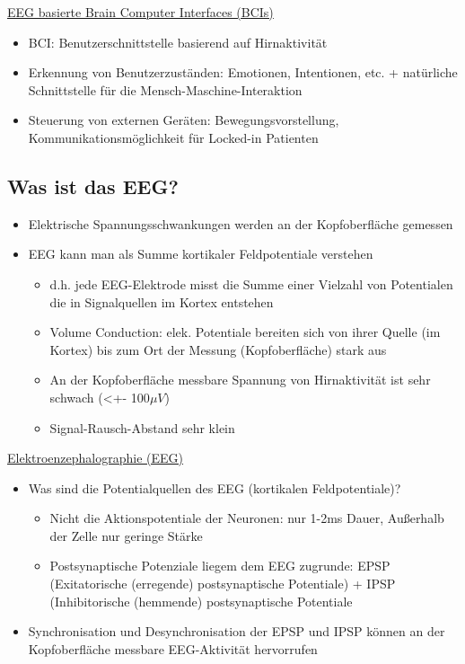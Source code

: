 \documentclass[a4paper,10pt,oneside]{article}
\begin{document}
\underline{EEG basierte Brain Computer Interfaces (BCIs)} \\	
	\begin{itemize}
		\item BCI: Benutzerschnittstelle basierend auf Hirnaktivität
		\item Erkennung von Benutzerzuständen: Emotionen, Intentionen, etc. + natürliche Schnittstelle für die Mensch-Maschine-Interaktion
		\item Steuerung von externen Geräten: Bewegungsvorstellung, Kommunikationsmöglichkeit für Locked-in Patienten
	\end{itemize}		
	
\subsection{Was ist das EEG?}
	\begin{itemize}
		\item Elektrische Spannungsschwankungen werden an der Kopfoberfläche gemessen
		\item EEG kann man als Summe kortikaler Feldpotentiale verstehen
			\begin{itemize}
				\item d.h. jede EEG-Elektrode misst die Summe einer Vielzahl von Potentialen die in Signalquellen im Kortex entstehen
				\item Volume Conduction: elek. Potentiale bereiten sich von ihrer Quelle (im Kortex) bis zum Ort der Messung (Kopfoberfläche) stark aus
				\item An der Kopfoberfläche messbare Spannung von Hirnaktivität ist sehr schwach (<+- 100$\mu V$)
				\item Signal-Rausch-Abstand sehr klein
			\end{itemize}
	\end{itemize}

\underline{Elektroenzephalographie (EEG)} \\
	\begin{itemize}
		\item Was sind die Potentialquellen des EEG (kortikalen Feldpotentiale)? 
			\begin{itemize}
				\item Nicht die Aktionspotentiale der Neuronen: nur 1-2ms Dauer, Außerhalb der Zelle nur geringe Stärke
				\item Postsynaptische Potenziale liegem dem EEG zugrunde: EPSP (Exitatorische (erregende) postsynaptische Potentiale) + IPSP (Inhibitorische (hemmende) postsynaptische Potentiale
			\end{itemize}
		\item Synchronisation und Desynchronisation der EPSP und IPSP können an der Kopfoberfläche messbare EEG-Aktivität hervorrufen
	\end{itemize}
\end{document}
